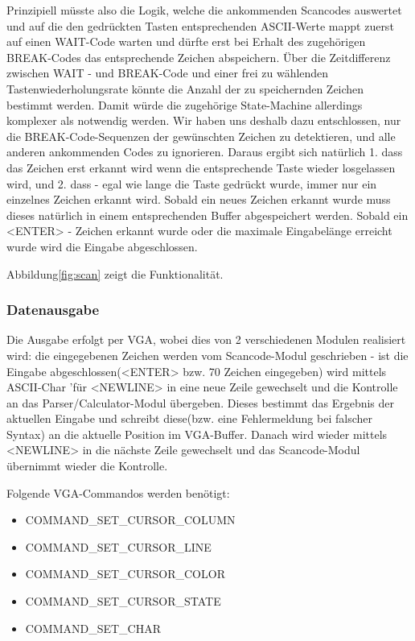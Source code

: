 Prinzipiell müsste also die Logik, welche die ankommenden Scancodes auswertet und auf die den gedrückten Tasten entsprechenden ASCII-Werte mappt zuerst auf einen WAIT-Code warten und dürfte erst bei Erhalt des zugehörigen BREAK-Codes das entsprechende Zeichen abspeichern. Über die Zeitdifferenz zwischen WAIT - und BREAK-Code und einer frei zu wählenden Tastenwiederholungsrate könnte die Anzahl der zu speichernden Zeichen bestimmt werden. Damit würde die zugehörige State-Machine allerdings komplexer als notwendig werden. Wir haben uns deshalb dazu entschlossen, nur die BREAK-Code-Sequenzen der gewünschten Zeichen zu detektieren, und alle anderen ankommenden Codes zu ignorieren. Daraus ergibt sich natürlich 1. dass das Zeichen erst erkannt wird wenn die entsprechende Taste wieder losgelassen wird, und 2. dass - egal wie lange die Taste gedrückt wurde, immer nur ein einzelnes Zeichen erkannt wird. 
Sobald ein neues Zeichen erkannt wurde muss dieses natürlich in einem entsprechenden Buffer abgespeichert werden. Sobald ein <ENTER> - Zeichen erkannt wurde oder die maximale Eingabelänge erreicht wurde wird die Eingabe abgeschlossen.

Abbildung\ref{fig:scan}  zeigt die Funktionalität.

\subsubsection{Datenausgabe}

Die Ausgabe erfolgt per VGA, wobei dies von 2 verschiedenen Modulen realisiert wird: die eingegebenen Zeichen werden vom Scancode-Modul geschrieben - ist die Eingabe abgeschlossen(<ENTER> bzw. 70 Zeichen eingegeben) wird mittels ASCII-Char 'für <NEWLINE> in eine neue Zeile gewechselt und die Kontrolle an das Parser/Calculator-Modul übergeben. Dieses bestimmt das Ergebnis der aktuellen Eingabe und schreibt diese(bzw. eine Fehlermeldung bei falscher Syntax) an die aktuelle Position im VGA-Buffer. Danach wird wieder mittels <NEWLINE> in die nächste Zeile gewechselt und das Scancode-Modul übernimmt wieder die Kontrolle.

Folgende VGA-Commandos werden benötigt:

\begin{itemize}

\item COMMAND\_SET\_CURSOR\_COLUMN
\item COMMAND\_SET\_CURSOR\_LINE
\item COMMAND\_SET\_CURSOR\_COLOR
\item COMMAND\_SET\_CURSOR\_STATE
\item COMMAND\_SET\_CHAR
\end{itemize}

